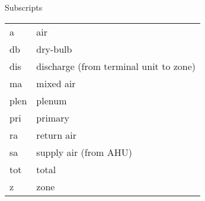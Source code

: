 \vspace{2em}

Subscripts

\begin{tabular}{ll}
    a    & air                                    \\
    db   & dry-bulb                               \\
    dis  & discharge (from terminal unit to zone) \\
    ma   & mixed air                              \\
    plen & plenum                                 \\
    pri  & primary                                \\
    ra   & return air                             \\
    sa   & supply air (from AHU)                  \\
    tot  & total                                  \\
    z    & zone                                   \\
\end{tabular}


\pagebreak{}
